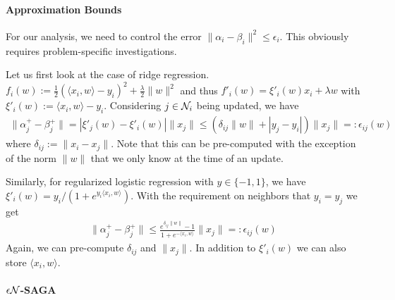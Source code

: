 \paragraph*{Approximation Bounds}

For our analysis, we need to control the error $\| \alpha_i - \beta_i \|^2 \le \epsilon_i$. This obviously requires problem-specific investigations. 

Let us first look at the case of ridge regression. $f_i(w) := \frac 12 (\langle x_i, w \rangle - y_i)^2 + \frac \lambda 2 \| w\|^2$ and thus $f'_i(w) = \xi'_i(w) x_i + \lambda w$ with $\xi'_i(w) := \langle x_i, w \rangle - y_i$. Considering $j \in {\cal N}_i$ being updated, we have
\begin{align}
\| \alpha_j^+ - \beta_j^+\| = | \xi'_j(w) - \xi'_i(w) | \| x_j\|
\le \left( \delta_{ij}  \|w\| +|y_j - y_i| \right) \| x_j\| =: \epsilon_{ij}(w)
\label{eq:bound-quadratic}
\end{align}
where $\delta_{ij} := \| x_i - x_j \|$. Note that this can be pre-computed with the exception of the norm $\| w\|$ that we only know at the time of an update. 

Similarly, for regularized logistic regression with $y \in \{-1,1\}$, we have $\xi'_i(w) = y_i/(1 + e^{y_i \langle x_i, w\rangle})$. With the requirement on neighbors that $y_i = y_j$ we get 
\begin{align}
\| \alpha^+_j - \beta^+_j\| \le \frac{e^{\delta_{ij} \| w\|}-1}{1+ e^{-\langle x_i, w \rangle}} \|x_j\|
 =: \epsilon_{ij}(w)
\label{eq:bound-logistic}
\end{align}
Again, we can pre-compute $\delta_{ij}$ and $\| x_j\|$. In addition to $\xi'_i(w)$ we can also store $\langle x_i, w \rangle$. %

\paragraph*{$\epsilon {\cal N}$-SAGA}

